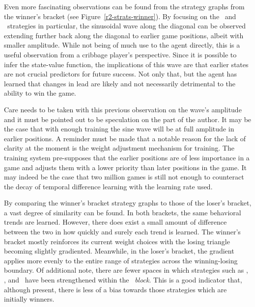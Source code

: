 Even more fascinating observations can be found from the strategy graphs
from the winner's bracket (see Figure~\ref{r2-strats-winner}).
%
By focusing on the \handmaxmin\ and \handmaxavg\ strategies in particular,
the sinusoidal wave along the diagonal can be observed extending further
back along the diagonal to earlier game positions,
albeit with smaller amplitude.
%
While not being of much use to the agent directly,
this is a useful observation from a cribbage player's perspective.
%
Since it is possible to infer the state-value function,
the implications of this wave are that earlier states are not crucial
predictors for future success.
%
Not only that,
but the agent has learned that changes in lead are likely and not necessarily
detrimental to the ability to win the game.

Care needs to be taken with this previous observation on the wave's amplitude
and it must be pointed out to be speculation on the part of the author.
%
It may be the case that with enough training the sine wave will be at full
amplitude in earlier positions.
%
A reminder must be made that
a notable reason for the lack of clarity at the moment is the weight adjustment
mechanism for training.
%
The training system pre-supposes that the earlier positions are of less
importance in a game and adjusts them with a lower priority than later positions
in the game.
%
It may indeed be the case that two million games is still not enough to
counteract the decay of temporal difference learning with the learning
rate used.





By comparing the winner's bracket strategy graphs to those of the loser's
bracket,
a vast degree of similarity can be found.
%
In both brackets,
the same behavioral trends are learned.
%
However,
there does exist a small amount of difference between the two
in how quickly and surely each trend is learned.
%
The winner's bracket mostly reinforces its current weight choices
with the losing triangle becoming slightly gradiented.
Meanwhile,
in the loser's bracket,
the gradient applies more evenly to the entire range of strategies
across the winning-losing boundary.
%
Of additional note,
there are fewer spaces in which
strategies such as \cribminavg, \peggingmaxavggained, and \peggingminavggiven\ 
have been strengthened within the \handmaxmin\ \textit{block}.
%
This is a good indicator that,
although present,
there is less of a bias towards those strategies which are initially winners.

